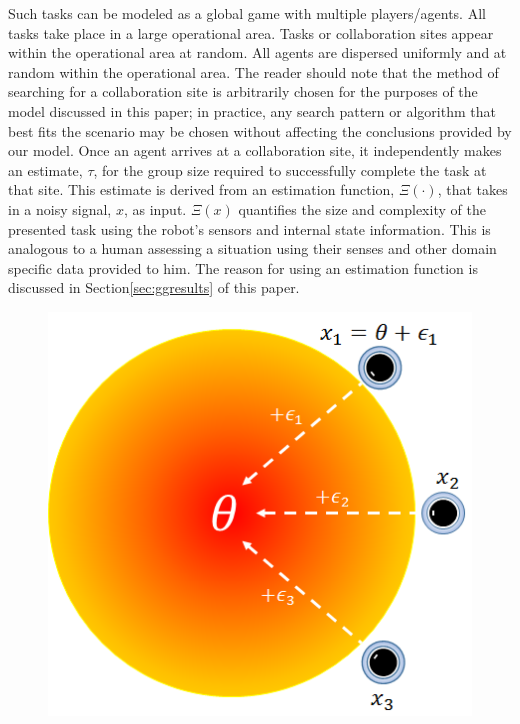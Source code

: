 \documentclass[conference]{IEEEtran}
\begin{document}
Such tasks can be modeled as a global game with multiple players/agents. All tasks take place in a large operational area. Tasks or collaboration sites appear within the operational area at random. All agents are dispersed uniformly and at random within the operational area. The reader should note that the method of searching for a collaboration site is arbitrarily chosen for the purposes of the model discussed in this paper; in practice, any search pattern or algorithm that best fits the scenario may be chosen without affecting the conclusions provided by our model. Once an agent arrives at a collaboration site, it independently makes an estimate, $\tau$, for the group size required to successfully complete the task at that site. This estimate is derived from an estimation function, $\Xi(\cdot)$, that takes in a noisy signal, $x$, as input. $\Xi(x)$ quantifies the size and complexity of the presented task using the robot's sensors and internal state information. This is analogous to a human assessing a situation using their senses and other domain specific data provided to him. The reason for using an estimation function is discussed in Section\ref{sec:ggresults} of this paper.

\begin{figure}[!ht]
\centering\includegraphics[width=\columnwidth]{../figures/globalgamesetup.png}
\centering\caption{}\label{fig:ggsetup}
\end{figure}
\end{document}
